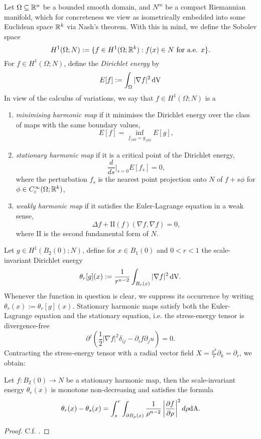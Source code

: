 Let $\Omega \subseteq \mathbb R^n$ be a bounded smooth domain, and $N^m$ be a compact Riemannian manifold, which for concreteness we view as isometrically embedded into some Euclidean space $\mathbb R^k$ via Nash's theorem. With this in mind, we define the Sobolev space
	\[ H^1 (\Omega ; N) := \{ f \in H^1 (\Omega ; \mathbb R^k) : f(x) \in N \text{ for a.e. $x$} \}. \]
For $f \in H^1 (\Omega ; N)$, define the \emph{Dirichlet energy} by 	
	\[ E[f] := \int_{\Omega} |\nabla f|^2 \, \mathrm{dV} \]
In view of the calculus of variations, we say that $f \in H^1 (\Omega; N)$ is a
\begin{enumerate}
	\item \emph{minimising harmonic map} if it minimises the Dirichlet energy over the class of maps with the same boundary values, 
		\[ E[f] = \inf_{f_{|\partial \Omega} = g_{|\partial \Omega}} E[g], \]
	
	\item \emph{stationary harmonic map} if it is a critical point of the Dirichlet energy, 
		\[ \frac{d}{ds}\Big|_{s = 0} E[f_s] = 0, \]
	where the perturbation $f_s$ is the nearest point projection onto $N$ of $f + s \phi$ for $\phi \in C^\infty_c (\Omega; \mathbb R^k)$, 
	
	\item \emph{weakly harmonic map} if it satisfies the Euler-Lagrange equation in a weak sense, 
		\[  \Delta f + \mathrm{II} (f) (\nabla f, \nabla f) = 0, \]
		where $\mathrm{II}$ is the second fundamental form of $N$. 
\end{enumerate}

Let $g \in H^1 (B_2 (0) ; N)$, define for $x \in B_1 (0)$ and $0 < r < 1$ the scale-invariant Dirichlet energy
	\[ \theta_r [g] (x) := \frac{1}{r^{n - 2}} \int_{B_r (x)} |\nabla f|^2 \, \mathrm{dV}. \]
Whenever the function in question is clear, we suppress its occurrence by writing $\theta_r (x) := \theta_r [g](x)$. Stationary harmonic maps satisfy both the Euler-Lagrange equation and the stationary equation, i.e. the stress-energy tensor is divergence-free
	\[ \partial^j \left(\frac12 |\nabla f|^2 \delta_{ij} -  \partial_i f \partial_j u \right) = 0.\]
Contracting the stress-energy tensor with a radial vector field $X = \tfrac{x^k}{r} \partial_k = \partial_r$, we obtain:	


\begin{lemma}
	Let $f: B_2 (0) \to N$ be a stationary harmonic map, then the scale-invariant energy $\theta_r (x)$ is monotone non-decreasing and satisfies the formula
			\[ \theta_r (x) - \theta_s (x) = \int_s^r \int_{\partial B_\rho (x)} \frac{1}{\rho^{n - 2}} \left| \frac{\partial f}{\partial \rho} \right|^2 d\rho \mathrm{dA}. \]	
\end{lemma}

\begin{proof}
	C.f. \cite{Lin1999}. 
\end{proof}